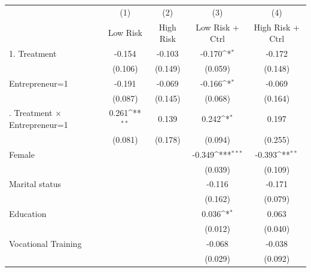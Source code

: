 {
\def\sym#1{\ifmmode^{#1}\else\(^{#1}\)\fi}
\begin{tabular}{l*{4}{c}}
\toprule
                    &\multicolumn{1}{c}{(1)}&\multicolumn{1}{c}{(2)}&\multicolumn{1}{c}{(3)}&\multicolumn{1}{c}{(4)}\\
                    &\multicolumn{1}{c}{Low Risk}&\multicolumn{1}{c}{High Risk}&\multicolumn{1}{c}{Low Risk + Ctrl}&\multicolumn{1}{c}{High Risk + Ctrl}\\
\midrule
1. Treatment        &      -0.154         &      -0.103         &      -0.170\sym{*}  &      -0.172         \\
                    &     (0.106)         &     (0.149)         &     (0.059)         &     (0.148)         \\
\addlinespace
Entrepreneur=1      &      -0.191         &      -0.069         &      -0.166\sym{*}  &      -0.069         \\
                    &     (0.087)         &     (0.145)         &     (0.068)         &     (0.164)         \\
\addlinespace
1. Treatment $\times$ Entrepreneur=1&       0.261\sym{**} &       0.139         &       0.242\sym{*}  &       0.197         \\
                    &     (0.081)         &     (0.178)         &     (0.094)         &     (0.255)         \\
\addlinespace
Female              &                     &                     &      -0.349\sym{***}&      -0.393\sym{**} \\
                    &                     &                     &     (0.039)         &     (0.109)         \\
\addlinespace
Marital status      &                     &                     &      -0.116         &      -0.171         \\
                    &                     &                     &     (0.162)         &     (0.079)         \\
\addlinespace
Education           &                     &                     &       0.036\sym{*}  &       0.063         \\
                    &                     &                     &     (0.012)         &     (0.040)         \\
\addlinespace
Vocational Training &                     &                     &      -0.068         &      -0.038         \\
                    &                     &                     &     (0.029)         &     (0.092)         \\

\end{tabular}}
